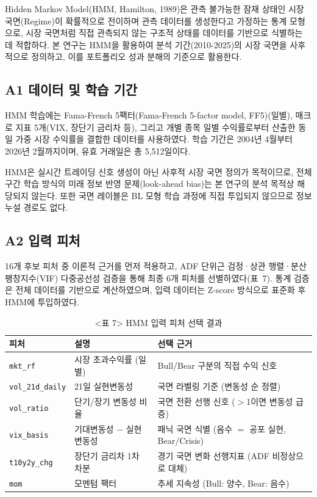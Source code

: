 \documentclass{article}
\begin{document}
Hidden Markov Model(HMM, Hamilton, 1989)은 관측 불가능한 잠재 상태인 시장 국면(Regime)이 확률적으로 전이하며 관측 데이터를 생성한다고 가정하는 통계 모형으로, 시장 국면처럼 직접 관측되지 않는 구조적 상태를 데이터를 기반으로 식별하는 데 적합하다. 본 연구는 HMM을 활용하여 분석 기간(2010-2025)의 시장 국면을 사후적으로 정의하고, 이를 포트폴리오 성과 분해의 기준으로 활용한다.

\subsection*{A1 데이터 및 학습 기간}

HMM 학습에는 Fama-French 5팩터(Fama-French 5-factor model, FF5)(일별), 매크로 지표 5개(VIX, 장단기 금리차 등), 그리고 개별 종목 일별 수익률로부터 산출한 동일 가중 시장 수익률을 결합한 데이터를 사용하였다. 학습 기간은 2004년 4월부터 2026년 2월까지이며, 유효 거래일은 총 5,512일이다.

HMM은 실시간 트레이딩 신호 생성이 아닌 사후적 시장 국면 정의가 목적이므로, 전체 구간 학습 방식의 미래 정보 반영 문제(look-ahead bias)는 본 연구의 분석 목적상 해당되지 않는다. 또한 국면 레이블은 BL 모형 학습 과정에 직접 투입되지 않으므로 정보 누설 경로도 없다.

\subsection*{A2 입력 피처}

16개 후보 피처 중 이론적 근거를 먼저 적용하고, ADF 단위근 검정·상관 행렬·분산팽창지수(VIF) 다중공선성 검증을 통해 최종 6개 피처를 선별하였다(표~7). 통계 검증은 전체 데이터를 기반으로 계산하였으며, 입력 데이터는 Z-score 방식으로 표준화 후 HMM에 투입하였다.

\begin{table}[ht]
\centering
\caption{<표 7> HMM 입력 피처 선택 결과}
\label{tab:a1_features}
\begin{tabular}{lll}
\toprule
\textbf{피처} & \textbf{설명} & \textbf{선택 근거} \\
\midrule
\texttt{mkt\_rf}       & 시장 초과수익률 (일별)     & Bull/Bear 구분의 직접 수익 신호 \\
\texttt{vol\_21d\_daily} & 21일 실현변동성           & 국면 라벨링 기준 (변동성 순 정렬) \\
\texttt{vol\_ratio}    & 단기/장기 변동성 비율      & 국면 전환 선행 신호 ($>$1이면 변동성 급증) \\
\texttt{vix\_basis}    & 기대변동성 $-$ 실현변동성  & 패닉 국면 식별 (음수 $=$ 공포 실현, Bear/Crisis) \\
\texttt{t10y2y\_chg}   & 장단기 금리차 1차 차분     & 경기 국면 변화 선행지표 (ADF 비정상으로 대체) \\
\texttt{mom}           & 모멘텀 팩터               & 추세 지속성 (Bull: 양수, Bear: 음수) \\
\bottomrule
\end{tabular}
\end{table}
\end{document}
